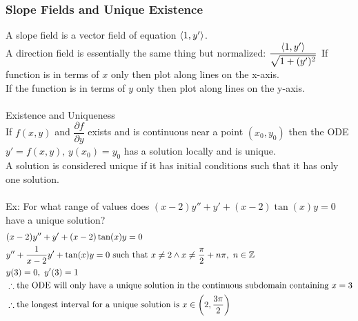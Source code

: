 \documentclass[11pt, fleqn]{article}
\begin{document}
\subsubsection{Slope Fields and Unique Existence}
A slope field is a vector field of equation $\left\langle 1,y' \right\rangle$.\\
A direction field is essentially the same thing but normalized: $\dfrac{\left\langle 1,y' \right\rangle}{\sqrt{1+(y')^2}}$
If function is in terms of $x$ only then plot along lines on the x-axis.\\
If the function is in terms of $y$ only then plot along lines on the y-axis.\\
\\
Existence and Uniqueness\\
If $f(x,y)$ and $\dfrac{\partial f}{\partial y}$ exists and is continuous near a point $(x_0,y_0)$ then the ODE $y'=f(x,y),\,y(x_0)=y_0$ has a solution locally and is unique.\\
A solution is considered unique if it has initial conditions such that it has only one solution.\\
\\
Ex: For what range of values does $(x-2)y''+y'+(x-2)\tan(x)y=0$ have a unique solution?
\begin{align*}
    &(x-2)y''+y'+(x-2)\tan(x)y=0\\
    &y''+\frac{1}{x-2}y'+\tan(x)y=0\text{ such that }x\neq 2\wedge x\neq \frac{\pi}{2}+n\pi,\ n\in\mathbb{Z}\\
    &y(3)=0,\ y'(3)=1\\
    &\therefore\text{the ODE will only have a unique solution in the continuous subdomain containing }x=3\\
    &\therefore\text{the longest interval for a unique solution is }x\in\left( 2,\frac{3\pi}{2} \right)
\end{align*}
\end{document}
